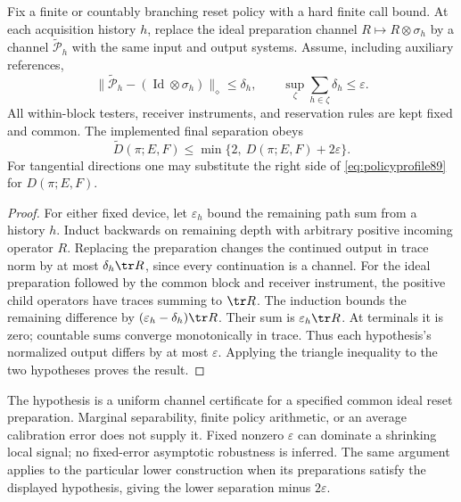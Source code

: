 \begin{proposition}\label{prop:approxreset89}
Fix a finite or countably branching reset policy with a hard finite
call bound.  At each acquisition history $h$, replace the ideal
preparation channel $R\mapsto R\otimes\sigma_h$ by a channel
$\widetilde{\mathcal P}_h$ with the same input and output systems.
Assume, including auxiliary references,
\[
 \|\widetilde{\mathcal P}_h-(\operatorname{Id}\otimes\sigma_h)
                      \|_\diamond\le\delta_h,\qquad
 \sup_\zeta\sum_{h\in\zeta}\delta_h\le\varepsilon.
\]
All within-block testers, receiver instruments, and reservation rules
are kept fixed and common.  The implemented final separation obeys
\begin{equation}\label{eq:approxreset89}
 \widetilde D(\pi;E,F)
 \le\min\{2,\ D(\pi;E,F)+2\varepsilon\}.
\end{equation}
For tangential directions one may substitute the right side of
\eqref{eq:policyprofile89} for $D(\pi;E,F)$.
\end{proposition}
\begin{proof}
For either fixed device, let $\varepsilon_h$ bound the remaining
path sum from a history $h$.  Induct backwards on remaining depth
with arbitrary positive incoming operator $R$.  Replacing the
preparation changes the continued output in trace norm by at most
$\delta_h\tr R$, since every continuation is a channel.  For the
ideal preparation followed by the common block and receiver
instrument, the positive child operators have traces summing to
$\tr R$.  The induction bounds the remaining difference by
$(\varepsilon_h-\delta_h)\tr R$.  Their sum is
$\varepsilon_h\tr R$.  At terminals it is zero; countable sums
converge monotonically in trace.  Thus each hypothesis's normalized
output differs by at most $\varepsilon$.  Applying the triangle
inequality to the two hypotheses proves the result.
\end{proof}

The hypothesis is a uniform channel certificate for a specified
common ideal reset preparation.  Marginal separability, finite
policy arithmetic, or an average calibration error does not supply
it.  Fixed nonzero $\varepsilon$ can dominate a shrinking local
signal; no fixed-error asymptotic robustness is inferred.  The same
argument applies to the particular lower construction when its
preparations satisfy the displayed hypothesis, giving the lower
separation minus $2\varepsilon$.

